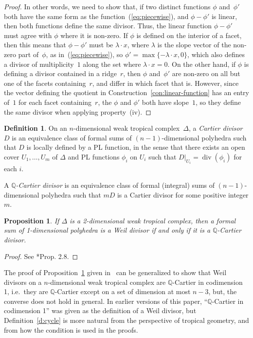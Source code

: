 \documentclass[11pt,reqno]{amsart}
\newtheorem{prop}[thm]{Proposition}
\theoremstyle{definition}
\newtheorem{defn}[thm]{Definition}
\newcommand{\defi}[1]{\emph{#1}}
\renewcommand{\div}{\operatorname{div}}
\newcommand{\QQ}{\mathbb Q}
\begin{document}
\begin{proof}
In other words, we need to
show that, if two distinct functions $\phi$ and~$\phi'$ both have the same form
as the function~(\ref{eq:piecewise}), and $\phi - \phi'$ is linear, then both
functions define the same divisor. Thus, the linear function $\phi - \phi'$ must
agree with $\phi$ where it is non-zero. If $\phi$ is defined on the interior of
a facet, then this means that $\phi - \phi'$ must be $\lambda \cdot x$, where
$\lambda$ is the slope vector of the non-zero part of~$\phi$, as
in~(\ref{eq:piecewise}), so $\phi' = \max\{-\lambda \cdot x, 0\}$, which also
defines a divisor of multiplicity~$1$ along the set where $\lambda \cdot x = 0$.
On the other hand, if $\phi$ is defining a divisor contained in a ridge~$r$,
then $\phi$ and~$\phi'$ are non-zero on all but one of the facets
containing~$r$, and differ in which facet that is. However, since the vector
defining the quotient in Construction~\ref{con:linear-function} has an entry
of~$1$ for each facet containing~$r$, the $\phi$ and $\phi'$ both have
slope~$1$, so they define the same divisor when applying property~(iv).
\end{proof}

\begin{defn}\label{d:cartier}
On an $n$-dimensional weak tropical complex~$\Delta$, a
\defi{Cartier divisor} $D$ is an equivalence class of formal sums of
$(n-1)$-dimensional polyhedra such that $D$
is locally defined by a PL function, in the sense that there exists an open
cover $U_1, \ldots, U_m$ of $\Delta$ and PL functions $\phi_i$ on $U_i$ such
that $D \vert_{U_i} = \div(\phi_i)$ for each $i$.

A \defi{$\QQ$-Cartier divisor} is an equivalence class of formal (integral) sums
of $(n-1)$-dimensional polyhedra such that $mD$ is a Cartier divisor for some
positive integer $m$.
\end{defn}

\begin{prop}\label{p:cartier-weil}
If $\Delta$ is a 2-dimensional weak tropical complex, then a formal sum of
1-dimensional polyhedra is a Weil divisor if and only if it is a $\QQ$-Cartier
divisor.
\end{prop}

\begin{proof}
See \cite{cartwright-surfaces}*{Prop. 2.8}.
\end{proof}

\begin{rmk}
The proof of Proposition~\ref{p:cartier-weil} given
in~\cite{cartwright-surfaces} can be generalized to show that Weil divisors on a
$n$-dimensional weak tropical complex are $\QQ$-Cartier in codimension 1,
i.e.\ they are $\QQ$-Cartier except on a set of dimension at most $n-3$, but, the
converse does not hold in general. In earlier versions of this paper,
``$\QQ$-Cartier in codimension 1'' was given as the definition of a Weil
divisor, but Definition~\ref{d:cycle} is more natural from the perspective of
tropical geometry, and from how the condition is used in the proofs.
\end{rmk}
\end{document}

